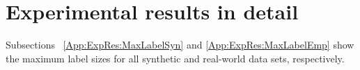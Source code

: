 %
%


\newpage
\section{Experimental results in detail}\label{App:ExpRes}
Subsections ~\ref{App:ExpRes:MaxLabelSyn} and \ref{App:ExpRes:MaxLabelEmp}  show the maximum label sizes for all synthetic and real-world data sets, respectively.

